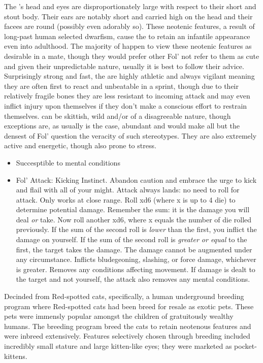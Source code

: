 \documentclass[twoside, 12pt, letterpaper]{report}\usepackage[]{graphicx}\usepackage[]{color}
\begin{document}
\begin{multicols*}{2}
\nsubsection{\rabbit}
The \rabbit 's head and eyes are disproportionately large with respect to their short and stout body. Their ears are notably short and carried high on the head and their facees are round (possibly even adorably so). These neotenic features, a result of long-past human selected dwarfism, cause the \rabbit to retain an infantile appearance even into adulthood. The majority of \rabbit happen to view these neotenic features as desirable in a mate, though they would prefer other Fol' not refer to them as cute and given their unpredictable nature, usually it is best to follow their advice.  Surprisingly strong and fast, the \rabbit are highly athletic and always vigilant meaning they are often first to react and unbeatable in a sprint, though due to their relatively fragile bones they are less resistant to incoming attack and may even inflict injury upon themselves if they don't make a conscious effort to restrain themselves. \rabbit can be skittish, wild and/or of a disagreeable nature, though exceptions are, as usually is the case, abundant and would make all but the densest of Fol' question the veracity of such stereotypes. They are also extremely active and energetic, though also prone to stress.

\begin{itemize}
\item{Succesptible to mental conditions}
\item{Fol' Attack: Kicking Instinct. Abandon caution and embrace the urge to kick and flail with all of your might. Attack always lands: no need to roll for attack. Only works at close range. Roll xd6 (where x is up to 4 die) to determine potential damage. Remember the sum: it is the damage you will deal \textit{or} take. Now roll another xd6, where x equals the number of die rolled previously. If the sum of the second roll is \textit{lower} than the first, you inflict the damage on yourself. If the sum of the second roll is \textit{greater or equal} to the first, the target takes the damage. The damage cannot be augmented under any circumstance. Inflicts bludegeoning, slashing, or force damage, whichever is greater. Removes any conditions affecting movement. If damage is dealt to the target and not yourself, the attack also removes any mental conditions.}
\end{itemize}


\nsubsection{\cat}
Decinded from Red-spotted cats, specifically, a human underground breeding program where Red-spotted cats had been breed for resale as exotic pets. These pets were immensly popular amongst the children of gratuitously wealthy humans. The breeding program breed the cats to retain neotenous features and were inbreed extensively. Features selectively chosen through breeding included incredibly small stature and large kitten-like eyes; they were marketed as pocket-kittens. 


\end{multicols*}
\end{document}
